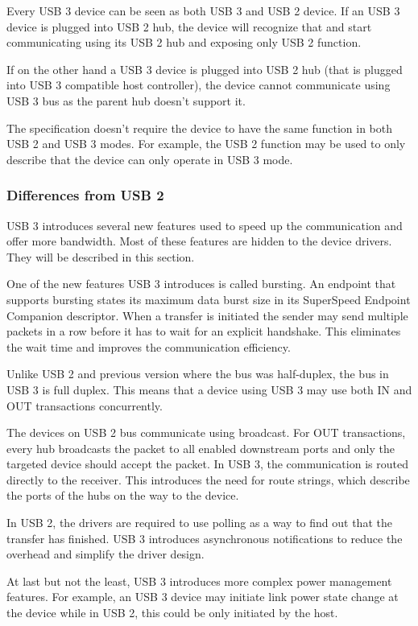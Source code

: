 Every USB 3 device can be seen as both USB 3 and USB 2 device. If an USB 3
device is plugged into USB 2 hub, the device will recognize that and start
communicating using its USB 2 hub and exposing only USB 2 function.

If on the other hand a USB 3 device is plugged into USB 2 hub (that is plugged
into USB 3 compatible host controller), the device cannot communicate using USB
3 bus as the parent hub doesn't support it.

The specification doesn't require the device to have the same function in both
USB 2 and USB 3 modes. For example, the USB 2 function may be used to only
describe that the device can only operate in USB 3 mode.

\subsubsection{Differences from USB 2}

USB 3 introduces several new features used to speed up the communication and
offer more bandwidth. Most of these features are hidden to the device drivers.
They will be described in this section.

One of the new features USB 3 introduces is called bursting. An endpoint that
supports bursting states its maximum data burst size in its SuperSpeed Endpoint
Companion descriptor. When a transfer is initiated the sender may send multiple
packets in a row before it has to wait for an explicit handshake. This
eliminates the wait time and improves the communication efficiency.

Unlike USB 2 and previous version where the bus was half-duplex, the bus in USB
3 is full duplex. This means that a device using USB 3 may use both IN and OUT
transactions concurrently.

The devices on USB 2 bus communicate using broadcast. For OUT transactions,
every hub broadcasts the packet to all enabled downstream ports and only the
targeted device should accept the packet. In USB 3, the communication is
routed directly to the receiver. This introduces the need for route strings,
which describe the ports of the hubs on the way to the device.

In USB 2, the drivers are required to use polling as a way to find out that the
transfer has finished. USB 3 introduces asynchronous notifications to reduce
the overhead and simplify the driver design.

At last but not the least, USB 3 introduces more complex power management
features. For example, an USB 3 device may initiate link power state change at
the device while in USB 2, this could be only initiated by the host.
